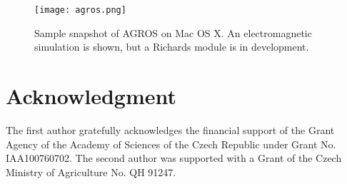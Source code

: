\documentclass[final,3p,times,twocolumn]{elsarticle}
\begin{document}
\begin{figure*}[!ht]
\begin{center}
\texttt{[image: agros.png]}
\end{center}
\vspace{-4mm}
\caption{Sample snapshot of AGROS on Mac OS X. An electromagnetic 
         simulation is shown, but a Richards module is in development.}
\label{fig:agros}
\end{figure*}



\section*{Acknowledgment}

The first author gratefully acknowledges the financial support
of the Grant Agency of the Academy of Sciences of the Czech 
Republic under Grant No. IAA100760702. The second author
was supported with a Grant of the Czech Ministry of Agriculture No.
QH 91247. 





\end{document}
